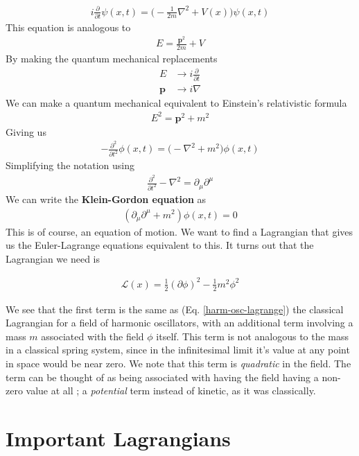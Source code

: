 \begin{align}
i\frac{\partial}{\partial t}\psi(x,t) =\Big(-\frac{1}{2m}\nabla^2 + V(x)\Big)\psi(x,t)
\end{align}
This equation is analogous to
\begin{align}
E = \frac{\textbf{p}^2}{2m} + V
\end{align}
By making the quantum mechanical replacements
\begin{align}
E &\rightarrow i\frac{\partial}{\partial t}\\
\textbf{p} &\rightarrow i\nabla
\end{align}
We can make a quantum mechanical equivalent to Einstein's relativistic formula
\begin{align}
E^2 = \textbf{p}^2 + m^2
\end{align}
Giving us
\begin{align}
- \frac{\partial^2}{\partial t^2}\phi(x,t) = \Big(-\nabla^2 + m^2\Big)\phi(x,t)
\end{align}
Simplifying the notation using
\begin{align}
\frac{\partial^2}{\partial t^2} - \nabla^2 = \partial_\mu\partial^\mu
\end{align}
We can write the \textbf{Klein-Gordon equation} as 
\begin{align}
\boxed{(\partial_\mu\partial^\mu + m^2)\phi(x,t) = 0}
\end{align}
This is of course, an equation of motion. We want to find a Lagrangian that gives us the Euler-Lagrange equations equivalent to this. It turns out that\cite{peskin} the Lagrangian we need is

\begin{align}
\mathcal{L}(x) = \frac{1}{2}(\partial\phi)^2 - \frac{1}{2}m^2\phi^2
\end{align}

We see that the first term is the same as (Eq. \ref{harm-osc-lagrange}) the classical Lagrangian for a field of harmonic oscillators, with an additional term involving a mass $m$ associated with the field $\phi$ itself. This term is not analogous to the mass in a classical spring system, since in the infinitesimal limit it's value at any point in space would be near zero. We note that this term is \emph{quadratic} in the field. The term can be thought of as being associated with having the field having a non-zero value at all \cite{peskin}; a \emph{potential} term instead of kinetic, as it was classically.

\section{Important Lagrangians}
